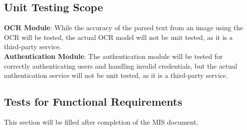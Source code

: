\documentclass[12pt, titlepage]{article}
\begin{document}
\subsection{Unit Testing Scope}

\textbf{OCR Module}: While the accuracy of the parsed text from an image using
the OCR will be tested, the actual OCR model will not be unit tested, as it is a
third-party service. \\
\textbf{Authentication Module}: The authentication module will be tested for
correctly authenticating users and handling invalid credentials, but the actual 
authentication service will not be unit tested, as it is a third-party service.


\subsection{Tests for Functional Requirements}

This section will be filled after completion of the MIS document.






					
					
					

\end{document}
